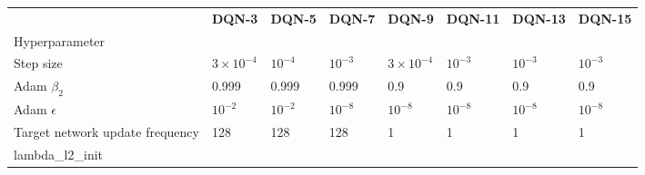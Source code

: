\begin{tabular}{llllllll}
 & \bfseries DQN-3 & \bfseries DQN-5 & \bfseries DQN-7 & \bfseries DQN-9 & \bfseries DQN-11 & \bfseries DQN-13 & \bfseries DQN-15 \\
Hyperparameter &  &  &  &  &  &  &  \\
Step size & $3 \times 10^{-4}$ & $10^{-4}$ & $10^{-3}$ & $3 \times 10^{-4}$ & $10^{-3}$ & $10^{-3}$ & $10^{-3}$ \\
Adam $\beta_2$ & 0.999 & 0.999 & 0.999 & 0.9 & 0.9 & 0.9 & 0.9 \\
Adam $\epsilon$ & $10^{-2}$ & $10^{-2}$ & $10^{-8}$ & $10^{-8}$ & $10^{-8}$ & $10^{-8}$ & $10^{-8}$ \\
Target network update frequency & 128 & 128 & 128 & 1 & 1 & 1 & 1 \\
lambda_l2_init &  &  &  &  &  &  &  \\
\end{tabular}
